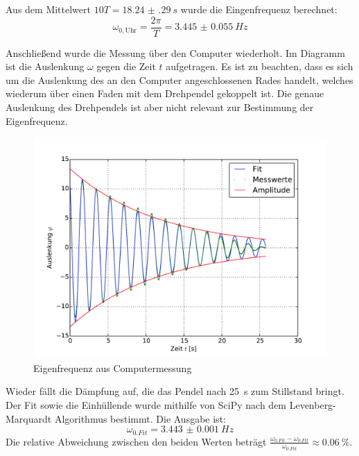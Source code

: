 Aus dem Mittelwert $10T=\SI{18.24(29)}{s}$ wurde die Eingenfrequenz berechnet:
\begin{equation}
  \omega_{0,\text{Uhr}}=\frac{2\pi}{T}=\SI{3.445(55)}{Hz}
  \label{eq:omega0uhr}
\end{equation}

Anschließend wurde die Messung über den Computer wiederholt. Im Diagramm ist die Auslenkung $\omega$ gegen die Zeit $t$ aufgetragen. Es ist zu beachten, dass es sich um die Auslenkung des an den Computer angeschlossenen Rades handelt, welches wiederum über einen Faden mit dem Drehpendel gekoppelt ist. Die genaue Auslenkung des Drehpendels ist aber nicht relevant zur Bestimmung der Eigenfrequenz.
\begin{figure}[H]
  \centering
  \includegraphics[scale=0.8]{computerdaten/Auswertung/2b)ungedaempft}
  \caption{Eigenfrequenz aus Computermessung}
  \label{fig:omega0pc}
\end{figure}
Wieder fällt die Dämpfung auf, die das Pendel nach \SI{25}{s} zum Stillstand bringt. Der Fit sowie die Einhüllende wurde mithilfe von SciPy nach dem Levenberg-Marquardt Algorithmus bestimmt. Die Ausgabe ist:
\begin{equation}
  \omega_{0.Fit}=\SI{3.443(1)}{Hz}
  \label{eq:omega0pc}
\end{equation}
Die relative Abweichung zwischen den beiden Werten beträgt $\frac{\omega_{0.Fit}-\omega_{0.Fit}}{\omega_{0.Fit}}\approx \SI{0.06}{\percent}$.

